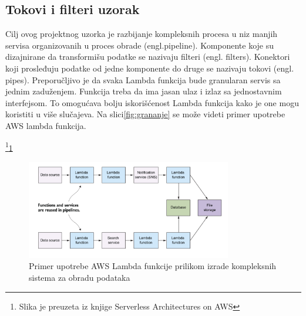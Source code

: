 \documentclass[12pt,oneside]{memoir}
\begin{document}
\subsection{Tokovi i filteri uzorak}
Cilj ovog projektnog uzorka je razbijanje kompleksnih procesa u niz manjih servisa organizovanih u proces obrade (engl.pipeline). Komponente koje su dizajnirane da transformišu podatke se nazivaju filteri (engl. filters). Konektori koji prosleđuju podatke od jedne komponente do druge se nazivaju tokovi (engl. pipes). Preporučljivo je da svaka Lambda funkcija bude granularan servis sa jednim zaduženjem. Funkcija treba da ima jasan ulaz i izlaz sa jednostavnim interfejsom. To omogućava bolju iskorišćenost Lambda funkcija kako je one mogu koristiti u više slučajeva. Na slici\ref{fig:grananje} se može videti primer upotrebe AWS lambda funkcija.

\footnote{Slika je preuzeta iz knjige Serverless Architectures on AWS}\ref{fig:pipeline}
\begin{figure}[!ht]
  \centering
  \includegraphics[width=0.8\textwidth]{Slika 16.png}
  \caption{Primer upotrebe AWS Lambda funkcije prilikom izrade kompleksnih sistema za obradu podataka}
  \label{fig:pipeline}
\end{figure}
\end{document}
